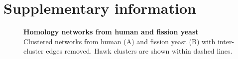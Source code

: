 \documentclass[a4paper,11pt,twoside,openright]{scrbook}
\begin{document}
\clearpage

\section{Supplementary information}
\vspace{30mm}

\begin{figure}[hb]
    \caption[Homology networks from human and fission yeast]{\sffamily \textbf{Homology networks from human and fission yeast} \\ \small Clustered networks from human (A) and fission yeast (B) with inter-cluster edges removed. Hawk clusters are shown within dashed lines.}
    \label{c1fs1}
\end{figure}

\end{document}
